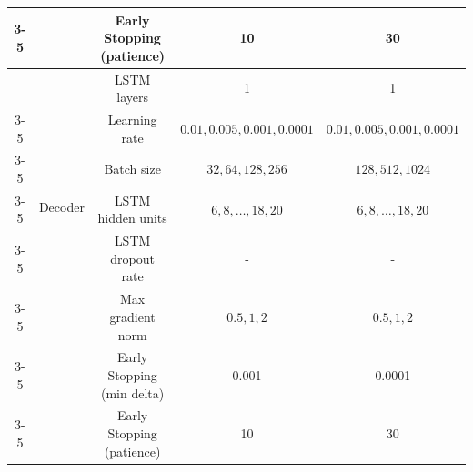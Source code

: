 \documentclass[10pt]{article} %
\begin{document}
\begin{table}[!htbp]
{\begin{tabular}{|c|c|c|c|c|}
\cline{3-5}
& & Early Stopping (patience) & 10& 30 \\
\hline
& \multirow{6}{*}{Decoder} & LSTM layers & 1 & 1 \\
\cline{3-5}
& & Learning rate & $0.01, 0.005, 0.001, 0.0001$ & $0.01, 0.005, 0.001, 0.0001$ \\
\cline{3-5}
& & Batch size & $32, 64, 128,256$& $128, 512, 1024$ \\
\cline{3-5}
& & LSTM hidden units & $6, 8, \dots, 18,20$& $6, 8, \dots, 18,20$\\
\cline{3-5}
& & LSTM dropout rate & - & - \\
\cline{3-5}
& & Max gradient norm & $0.5, 1, 2$ & $0.5, 1, 2$ \\
\cline{3-5}
& & Early Stopping (min delta) & 0.001& 0.0001 \\
\cline{3-5}
& & Early Stopping (patience) & 10& 30 \\
\hline
\end{tabular}%
}
\end{table}
\end{document}
